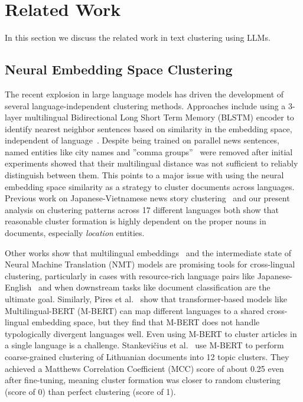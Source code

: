 \section{Related Work}\label{section:related_work}

In this section we discuss the related work in text clustering using LLMs.

\subsection{Neural Embedding Space Clustering} 
The recent explosion in large language models has driven the development of several language-independent clustering methods. Approaches include using a 3-layer multilingual Bidirectional Long Short Term Memory (BLSTM) encoder to identify nearest neighbor sentences based on similarity in the embedding space, independent of language~\cite{Schw18}. Despite being trained on parallel news sentences, named entities like city names and ''comma groups''~\cite{Lieb10b} were removed after initial experiments showed that their multilingual distance was not sufficient to reliably distinguish between them. This points to a major issue with using the neural embedding space similarity as a strategy to cluster documents across languages. Previous work on Japanese-Vietnamese news story clustering~\cite{Hong17} and our present analysis on clustering patterns across 17 different languages both show that reasonable cluster formation is highly dependent on the proper nouns in documents, especially \emph{location} entities. 

Other works show that multilingual embeddings~\cite{Amma18} and the intermediate state of Neural Machine Translation (NMT) models are promising tools for cross-lingual clustering, particularly in cases with resource-rich language pairs like Japanese-English~\cite{Seki18} and when downstream tasks like document classification are the ultimate goal. %
Similarly, Pires et al.~\cite{Pire19} show that transformer-based models like Multilingual-BERT (M-BERT) can map different languages to a shared cross-lingual embedding space, but they find that M-BERT does not handle typologically divergent languages well.
Even using M-BERT to cluster articles in a single language is a challenge. Stankevičius et al.~\cite{Stan20} use M-BERT to perform coarse-grained clustering of Lithuanian documents into 12 topic clusters. They achieved a Matthews Correlation Coefficient (MCC) score of about 0.25 even after fine-tuning, meaning cluster formation was closer to random clustering (score of 0) than perfect clustering (score of 1).

